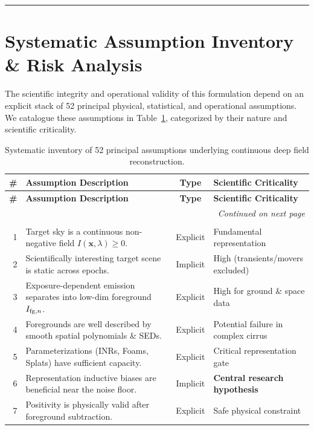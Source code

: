 \documentclass[11pt,a4paper]{article}
\begin{document}
\vspace{1em}
\hrule
\vspace{1em}

\section{Systematic Assumption Inventory \& Risk Analysis}

The scientific integrity and operational validity of this formulation depend on an explicit stack of 52 principal physical, statistical, and operational assumptions. We catalogue these assumptions in Table~\ref{tab:assumptions}, categorized by their nature and scientific criticality.

\begingroup
\small
\begin{longtable}{r p{8.2cm} c p{4.0cm}}
\caption{Systematic inventory of 52 principal assumptions underlying continuous deep field reconstruction.} \label{tab:assumptions} \\
\toprule
\textbf{\#} & \textbf{Assumption Description} & \textbf{Type} & \textbf{Scientific Criticality} \\
\midrule
\endfirsthead
\toprule
\textbf{\#} & \textbf{Assumption Description} & \textbf{Type} & \textbf{Scientific Criticality} \\
\midrule
\endhead
\midrule
\multicolumn{4}{r}{\emph{Continued on next page}} \\
\endfoot
\bottomrule
\endlastfoot
\multicolumn{4}{l}{\textbf{A. Representation \& Astrophysical Reality}} \\
1 & Target sky is a continuous non-negative field $I(\boldsymbol{x}, \lambda) \ge 0$. & Explicit & Fundamental representation \\
2 & Scientifically interesting target scene is static across epochs. & Implicit & High (transients/movers excluded) \\
3 & Exposure-dependent emission separates into low-dim foreground $I_{{\rm fg},n}$. & Explicit & High for ground \& space data \\
4 & Foregrounds are well described by smooth spatial polynomials \& SEDs. & Explicit & Potential failure in complex cirrus \\
5 & Parameterizations (INRs, Foams, Splats) have sufficient capacity. & Explicit & Critical representation gate \\
6 & Representation inductive biases are beneficial near the noise floor. & Implicit & \textbf{Central research hypothesis} \\
7 & Positivity is physically valid after foreground subtraction. & Explicit & Safe physical constraint \\

\end{longtable}
\end{document}
